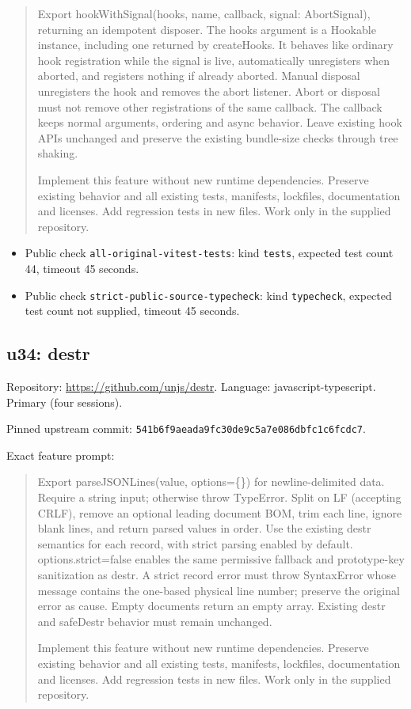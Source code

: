 \documentclass[manuscript,screen,nonacm]{acmart}
\providecommand{\tightlist}{\setlength{\itemsep}{0pt}\setlength{\parskip}{0pt}}
\begin{document}
\begin{quote}
Export hookWithSignal(hooks, name, callback, signal: AbortSignal),
returning an idempotent disposer. The hooks argument is a Hookable
instance, including one returned by createHooks. It behaves like
ordinary hook registration while the signal is live, automatically
unregisters when aborted, and registers nothing if already aborted.
Manual disposal unregisters the hook and removes the abort listener.
Abort or disposal must not remove other registrations of the same
callback. The callback keeps normal arguments, ordering and async
behavior. Leave existing hook APIs unchanged and preserve the existing
bundle-size checks through tree shaking.

Implement this feature without new runtime dependencies. Preserve
existing behavior and all existing tests, manifests, lockfiles,
documentation and licenses. Add regression tests in new files. Work only
in the supplied repository.
\end{quote}

\begin{itemize}
\tightlist
\item
  Public check \nolinkurl{all-original-vitest-tests}: kind
  \texttt{tests}, expected test count 44, timeout 45 seconds.
\item
  Public check \nolinkurl{strict-public-source-typecheck}: kind
  \texttt{typecheck}, expected test count not supplied, timeout 45
  seconds.
\end{itemize}

\subsection{u34: destr}\label{u34-destr}

Repository: \url{https://github.com/unjs/destr}. Language:
javascript-typescript. Primary (four sessions).

Pinned upstream commit:
\nolinkurl{541b6f9aeada9fc30de9c5a7e086dbfc1c6fcdc7}.

Exact feature prompt:

\begin{quote}
Export parseJSONLines(value, options=\{\}) for newline-delimited data.
Require a string input; otherwise throw TypeError. Split on LF
(accepting CRLF), remove an optional leading document BOM, trim each
line, ignore blank lines, and return parsed values in order. Use the
existing destr semantics for each record, with strict parsing enabled by
default. options.strict=false enables the same permissive fallback and
prototype-key sanitization as destr. A strict record error must throw
SyntaxError whose message contains the one-based physical line number;
preserve the original error as cause. Empty documents return an empty
array. Existing destr and safeDestr behavior must remain unchanged.

Implement this feature without new runtime dependencies. Preserve
existing behavior and all existing tests, manifests, lockfiles,
documentation and licenses. Add regression tests in new files. Work only
in the supplied repository.
\end{quote}
\end{document}
